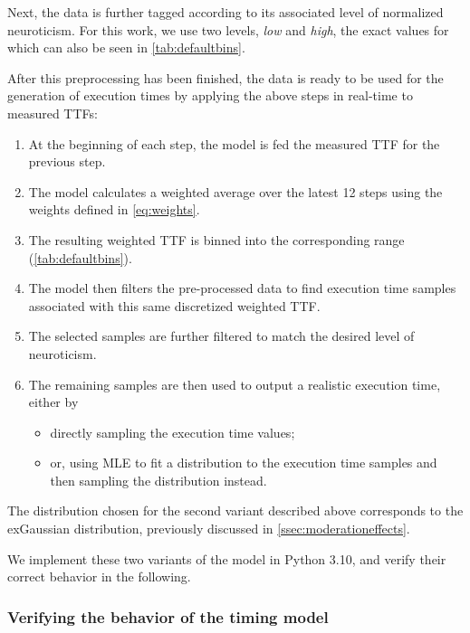 Next, the data is further tagged according to its associated level of normalized neuroticism.
For this work, we use two levels, \emph{low} and \emph{high}, the exact values for which can also be seen in \cref{tab:defaultbins}.

After this preprocessing has been finished, the data is ready to be used for the generation of execution times by applying the above steps in real-time to measured \glspl{TTF}:

\begin{enumerate}
    \item At the beginning of each step, the model is fed the measured \gls{TTF} for the previous step.
    \item The model calculates a weighted average over the latest \num{12} steps using the weights defined in \cref{eq:weights}.
    \item The resulting weighted \gls{TTF} is binned into the corresponding range (\cref{tab:defaultbins}).
    \item The model then filters the pre-processed data to find execution time samples associated with this same discretized weighted \gls{TTF}.
    \item The selected samples are further filtered to match the desired level of neuroticism.
    \item The remaining samples are then used to output a realistic execution time, either by
    \begin{itemize}
        \item directly sampling the execution time values;
        \item or, using \gls{MLE} to fit a distribution to the execution time samples and then sampling the distribution instead.
    \end{itemize}
\end{enumerate}

The distribution chosen for the second variant described above corresponds to the \gls{exGaussian} distribution, previously discussed in \cref{ssec:moderationeffects}.

We implement these two variants of the model in Python 3.10, and verify their correct behavior in the following.

\subsubsection{Verifying the behavior of the timing model}\label{ssec:model:verification}

